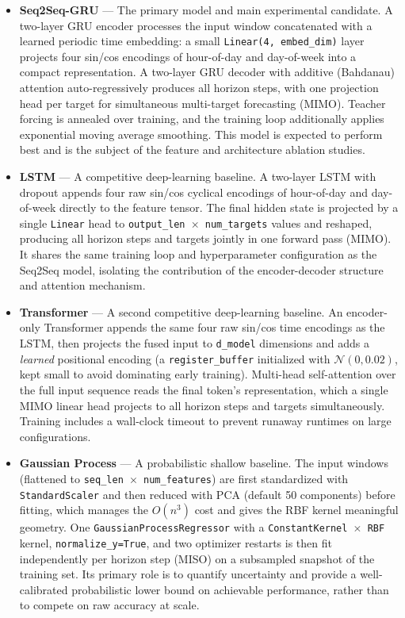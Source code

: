 \documentclass[12pt]{article}
\begin{document}
\begin{itemize}

\item \textbf{Seq2Seq-GRU} — The primary model and main experimental candidate. A two-layer GRU encoder processes the input window concatenated with a learned periodic time embedding: a small \texttt{Linear(4, embed\_dim)} layer projects four sin/cos encodings of hour-of-day and
day-of-week into a compact representation. A two-layer GRU decoder with additive (Bahdanau) attention auto-regressively produces all horizon steps, with one projection head per target for simultaneous multi-target forecasting (MIMO). Teacher forcing is annealed over training, and the training loop additionally applies exponential moving average smoothing. This model is expected to perform best and is the subject of the feature and architecture ablation studies.

\item \textbf{LSTM} — A competitive deep-learning baseline. A two-layer LSTM with dropout appends four raw sin/cos cyclical encodings of hour-of-day and day-of-week directly to the feature tensor. The final hidden state is projected by a single \texttt{Linear} head to \texttt{output\_len
$\times$ num\_targets} values and reshaped, producing all horizon steps and targets jointly in one forward pass (MIMO). It shares the same training loop and hyperparameter configuration as the Seq2Seq model, isolating the contribution of the encoder-decoder structure and attention mechanism.

\item \textbf{Transformer} — A second competitive deep-learning baseline. An encoder-only Transformer appends the same four raw sin/cos time encodings as the LSTM, then projects the fused input to \texttt{d\_model} dimensions and adds a \emph{learned} positional encoding (a \texttt{register\_buffer} initialized with $\mathcal{N}(0, 0.02)$, kept small to avoid dominating
early training). Multi-head self-attention over the full input sequence reads the final token's representation, which a single MIMO linear head projects to all horizon steps and targets simultaneously. Training includes a wall-clock timeout to prevent runaway runtimes on large configurations.

\item \textbf{Gaussian Process} — A probabilistic shallow baseline. The input windows (flattened to \texttt{seq\_len $\times$ num\_features}) are first standardized with \texttt{StandardScaler} and then reduced with PCA (default 50 components) before fitting, which manages the $O(n^3)$ cost and gives the RBF kernel meaningful geometry. One \texttt{GaussianProcessRegressor} with a \texttt{ConstantKernel $\times$ RBF} kernel, \texttt{normalize\_y=True}, and two optimizer restarts is then fit independently per horizon step (MISO) on a subsampled snapshot of the training set. Its primary role is to quantify uncertainty and provide a well-calibrated probabilistic lower bound on achievable performance, rather than to compete on raw accuracy at scale.


\end{itemize}
\end{document}
